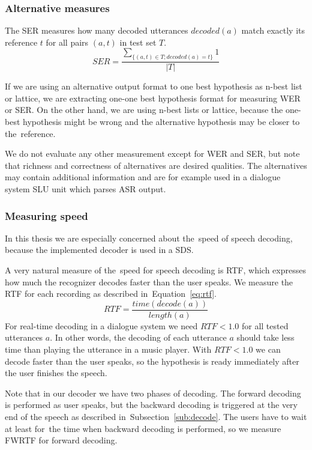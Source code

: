 {\subsubsection*{Alternative measures}
The \acl{SER} measures how many decoded utterances $decoded(a)$ match exactly its reference $t$
for all pairs $(a, t)$ in test set $T$.
\begin{equation}
    SER = \frac{\sum_{\{(a, t) \in T; decoded(a) = t\}}{1}}{|T|}
\end{equation}

If we are using an alternative output format to one best hypothesis as n-best list or lattice, we are extracting one-one best hypothesis format for measuring \ac{WER} or \ac{SER}.
On the other hand, we are using n-best lists or lattice, because the one-best hypothesis might be wrong and the alternative hypothesis may be closer to the~reference.

We do not evaluate any other measurement except for \ac{WER} and \ac{SER}, but note that richness and correctness of alternatives are desired qualities.
The alternatives may contain additional information and are for example used in a dialogue system \acl{SLU} unit which parses \ac{ASR} output.

\subsubsection*{Measuring speed}
\label{sub:the_metrics_in_speech_recognition}
In this thesis we are especially concerned about the~speed of speech decoding, because the implemented decoder is used in a \acl{SDS}.

A very natural measure of the~speed for speech decoding is \acl{RTF}, which expresses how much the recognizer decodes faster than the user speaks.
We measure the \ac{RTF} for each recording as described in~Equation~\ref{eq:rtf}.
\begin{equation}\label{eq:rtf}
    RTF = \frac{time(decode(a))}{length(a)}
\end{equation}
For real-time decoding in a dialogue system we need $RTF < 1.0$ for all tested utterances $a$.
In other words, the decoding of each utterance $a$ should take less time than playing the utterance in a music player.
With $RTF < 1.0$ we can decode faster than the user speaks, so the hypothesis is ready immediately after the user finishes the speech. 

Note that in our decoder we have two phases of decoding.
The forward decoding is performed as user speaks, but the backward decoding is triggered at the very end of the speech as described in~Subsection~\ref{sub:decode}.
The users have to wait at least for~the time when backward decoding is performed, so we measure \ac{FWRTF} for forward decoding.

}
